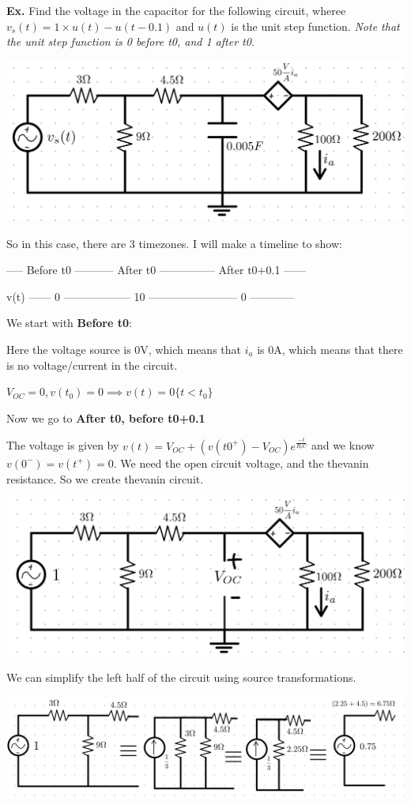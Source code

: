 \documentclass[12pt,letterpaper]{article} \usepackage{amsmath} \usepackage{graphicx} \usepackage[margin=1in]{geometry} \usepackage{longtable}  \usepackage{amssymb}
\begin{document}
	\begin{mdframed}[]
	\textbf{Ex. } Find the voltage in the capacitor for the following circuit, wheree $v_s(t)=1\times u(t)-u(t-0.1)$ and $u(t)$ is the unit step function. 
	\textit{Note that the unit step function is 0 before t0, and 1 after t0.}
	
	\begin{center}
		\includegraphics[width=0.7\linewidth]{ex8}
	\end{center}
	
	
	So in this case, there are 3 timezones. I will make a timeline to show:
	
	----- Before t0 ----------- After t0 --------------- After t0+0.1 ------
	
	v(t) ------ 0 ------------------ 10 ------------------------ 0 ------------
	
	We start with \textbf{Before t0}:
	
	Here the voltage source is 0V, which means that $i_a$ is 0A, which means that there is no voltage/current in the circuit. 
	
	$V_{OC}=0, v(t_0)=0 \implies v(t)=0 \{t<t_0\}$
	
	Now we go to \textbf{After t0, before t0+0.1}
	
	The voltage is given by $v(t)=V_{OC}+(v(t0^+)-V_{OC})e^{\frac{-t}{R_t C}}$ and we know $v(0^-)=v(t^+)=0$. We need the open circuit voltage, and the thevanin resistance. So we create thevanin circuit. 
	\begin{center}
		\includegraphics[width=0.5\linewidth]{ex8-2}
	\end{center}
	We can simplify the left half of the circuit using source transformations. 
	\begin{center}
		\includegraphics[width=0.95\linewidth]{ex8-3}
	\end{center}


\end{mdframed}
\end{document}
